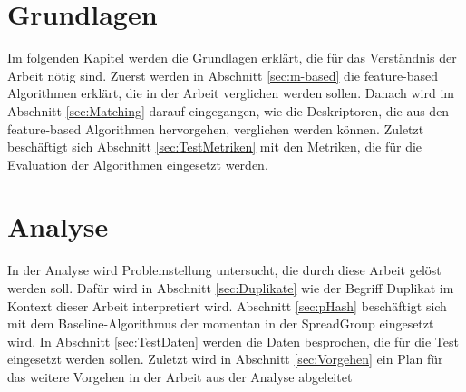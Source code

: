 






\frontmatter												%



\tableofcontents										%

\mainmatter													%



\chapter{Grundlagen}
\label{sec:Grundlagen}
Im folgenden Kapitel werden die Grundlagen erklärt, die für das Verständnis der Arbeit nötig sind.
Zuerst werden in Abschnitt \ref{sec:m-based} die feature-based Algorithmen erklärt, die in der Arbeit verglichen werden sollen.
Danach wird im Abschnitt \ref{sec:Matching} darauf eingegangen, wie die Deskriptoren, die aus den feature-based Algorithmen hervorgehen, verglichen werden können. 
Zuletzt beschäftigt sich Abschnitt \ref{sec:TestMetriken} mit den Metriken, die für die Evaluation der Algorithmen eingesetzt werden. 








\chapter{Analyse}
\label{sec:Analyse}
In der Analyse wird Problemstellung untersucht, die durch diese Arbeit gelöst werden soll. 
Dafür wird in Abschnitt \ref{sec:Duplikate} wie der Begriff Duplikat im Kontext dieser Arbeit interpretiert wird.
Abschnitt \ref{sec:pHash} beschäftigt sich mit dem Baseline-Algorithmus der momentan in der SpreadGroup eingesetzt wird.
In Abschnitt \ref{sec:TestDaten} werden die Daten besprochen, die für die Test eingesetzt werden sollen.
Zuletzt wird in Abschnitt \ref{sec:Vorgehen} ein Plan für das weitere Vorgehen in der Arbeit aus der Analyse abgeleitet 





